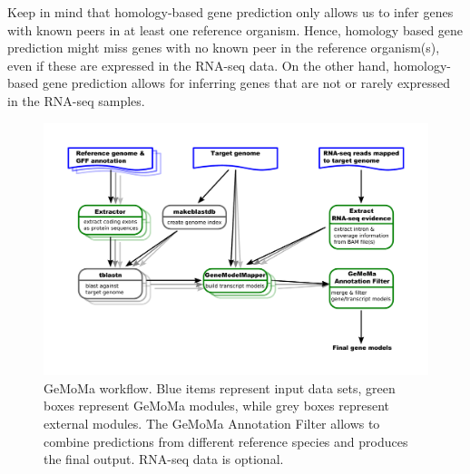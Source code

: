 \documentclass{article}
\begin{document}
Keep in mind that homology-based gene prediction only allows us to infer genes with known peers in at least one reference organism. Hence, homology based gene prediction might miss genes with no known peer in the reference organism(s), even if these are expressed in the RNA-seq data. On the other hand, homology-based gene prediction allows for inferring genes that are not or rarely expressed in the RNA-seq samples.

\begin{figure}[h]
\includegraphics[width=\linewidth]{drawing.pdf}
\caption{GeMoMa workflow. Blue items represent input data sets, green boxes represent GeMoMa modules, while grey boxes represent external modules. The GeMoMa Annotation Filter allows to combine predictions from different reference species and produces the final output. RNA-seq data is optional.}
\end{figure}

\clearpage
\end{document}
